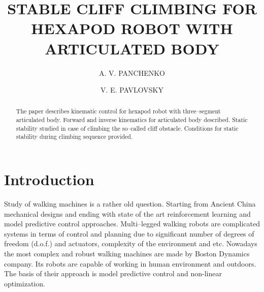 \documentclass{ws-procs9x6}
\begin{document}
\title{STABLE CLIFF CLIMBING FOR HEXAPOD ROBOT WITH ARTICULATED BODY}

\author{A. V. PANCHENKO}

\address{Faculty of Mechanics and Mathematics, Lomonosov Moscow State University,\\
Moscow, 119991, Russia\\
E-mail: PanchenkoAV@vap.ru\\}


\author{V. E. PAVLOVSKY}

\address{Faculty of Mechanics and Mathematics, Lomonosov Moscow State University,\\
Moscow, 119991, Russia\\
E-mail: vlpavl@mail.ru\\}

\begin{abstract}
The paper describes kinematic control for hexapod robot with three--segment articulated body. Forward and inverse kinematics for articulated body described. Static stability studied in case of climbing the so--called cliff obstacle. Conditions for static stability during climbing sequence provided.
\end{abstract}


\bodymatter

\section{Introduction}\label{aba:intoduction}
Study of walking machines is a rather old question. Starting from 
Ancient China mechanical designs\cite{yan2005historical} and ending with state of the art reinforcement learning \cite{peng2017deeploco} and model predictive control approaches\cite{diedam2008online}. Multi--legged walking robots are complicated systems in terms of control and planning due to significant number of degrees of freedom (d.o.f.) and actuators, complexity of the environment and etc. Nowadays the most complex and robust walking machines are made by Boston Dynamics company\cite{raibert2008bigdog}. Its robots are capable of working in human environment and outdoors. The basis of their approach is model predictive control and non-linear optimization. 

\end{document}
